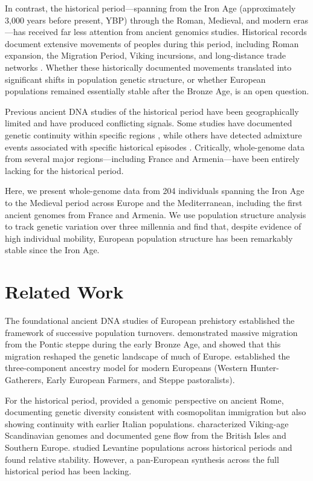 \documentclass[11pt]{article}
\begin{document}
In contrast, the historical period---spanning from the Iron Age (approximately 3,000 years before present, YBP) through the Roman, Medieval, and modern eras---has received far less attention from ancient genomics studies. Historical records document extensive movements of peoples during this period, including Roman expansion, the Migration Period, Viking incursions, and long-distance trade networks \citep{haber2019genetic}. Whether these historically documented movements translated into significant shifts in population genetic structure, or whether European populations remained essentially stable after the Bronze Age, is an open question.

Previous ancient DNA studies of the historical period have been geographically limited and have produced conflicting signals. Some studies have documented genetic continuity within specific regions \citep{antonio2019ancient}, while others have detected admixture events associated with specific historical episodes \citep{margaryan2020population}. Critically, whole-genome data from several major regions---including France and Armenia---have been entirely lacking for the historical period.

Here, we present whole-genome data from 204 individuals spanning the Iron Age to the Medieval period across Europe and the Mediterranean, including the first ancient genomes from France and Armenia. We use population structure analysis to track genetic variation over three millennia and find that, despite evidence of high individual mobility, European population structure has been remarkably stable since the Iron Age.

\section{Related Work}

The foundational ancient DNA studies of European prehistory established the framework of successive population turnovers. \citet{haak2015massive} demonstrated massive migration from the Pontic steppe during the early Bronze Age, and \citet{allentoft2015population} showed that this migration reshaped the genetic landscape of much of Europe. \citet{lazaridis2014ancient} established the three-component ancestry model for modern Europeans (Western Hunter-Gatherers, Early European Farmers, and Steppe pastoralists).

For the historical period, \citet{antonio2019ancient} provided a genomic perspective on ancient Rome, documenting genetic diversity consistent with cosmopolitan immigration but also showing continuity with earlier Italian populations. \citet{margaryan2020population} characterized Viking-age Scandinavian genomes and documented gene flow from the British Isles and Southern Europe. \citet{haber2019genetic} studied Levantine populations across historical periods and found relative stability. However, a pan-European synthesis across the full historical period has been lacking.
\end{document}
